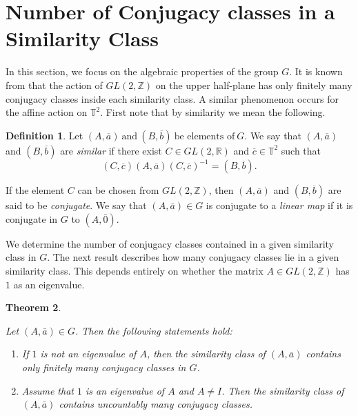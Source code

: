 \documentclass[12pt]{amsart}
\theoremstyle{plain}
\newtheorem{theorem}{Theorem}[section]
\theoremstyle{definition}
\newtheorem{definition}[theorem]{Definition}
\theoremstyle{remark}
\begin{document}
\section{Number of Conjugacy classes in a Similarity Class}\label{number} 
In this section, we focus on the algebraic properties of the group $G$.
It is known from \cite{ATW} that the action of $GL(2,\mathbb{Z})$ on the upper half-plane has only finitely many conjugacy classes inside each similarity class.
A similar phenomenon occurs for the affine action on $\mathbb{T}^2$. First note that by similarity we mean the following. 
\begin{definition}\label{sim} Let $(A,\overline{a})~\text{and}~(B,\overline{b}) ~\text{be elements of}~ G$.  
We say that $(A,\overline{a})$ and $(B,\overline{b})$ are \emph{similar} if there exist 
$C \in GL(2,\mathbb{R})$ and $\overline{c} \in \mathbb{T}^{2}$ such that 
$$(C,\overline{c})(A,\overline{a})(C,\overline{c})^{-1}=(B,\overline{b}).$$  

If the element $C$ can be chosen from  $GL(2,\mathbb{Z})$, then 
$(A,\overline{a})$ and $(B,\overline{b})$ are said to be \emph{conjugate}. We say that $(A,\bar a)\in G$ is conjugate to a \emph{linear map} if it is
conjugate in $G$ to $(A,\bar{0})$.
\end{definition}

We determine the number of conjugacy classes contained in a given similarity class in $G$.  
The next result describes how many conjugacy classes lie in a given similarity class.
This depends entirely on whether the matrix $A \in GL(2,\mathbb{Z})$ has $1$ as an eigenvalue.
\begin{theorem} \label{orbit counting}

Let $(A,\bar a)\in G$. Then the following statements hold:

\begin{enumerate}
    \item If $1$ is not an eigenvalue of $A$, then the similarity
    class of $(A,\bar a)$ contains only finitely many conjugacy classes in $G$.

    \item Assume that $1$ is an eigenvalue of $A$ and $A\neq I$. Then the similarity class of  $(A,\bar a)$ contains uncountably many conjugacy classes.

\end{enumerate}
\end{theorem}
\end{document}
